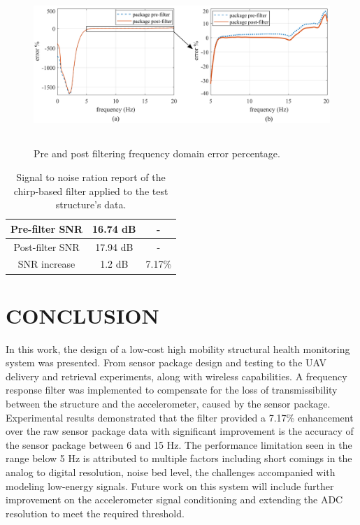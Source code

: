 \documentclass[]{spie}  %
\begin{document}
	\begin{figure} [H]
		\centering
		\includegraphics[height=6cm]{figures/Chirp Structure Error.png}
		\caption{Pre and post filtering frequency domain error percentage.}
		\label{fig:chirp structure error} 	
	\end{figure} 

	\begin{table}[H]
	\caption{Signal to noise ration report of the chirp-based filter applied to the test structure’s data.} 
	\label{tab:SNR Report}
	\begin{center}       
		\begin{tabular}{|c|c|c|} 
			\hline
			\rule[-1ex]{0pt}{3.5ex}  Pre-filter SNR & 16.74 dB & - \\
			\hline
			\rule[-1ex]{0pt}{3.5ex}  Post-filter SNR & 17.94 dB & - \\
			\hline
			\rule[-1ex]{0pt}{3.5ex}  SNR increase & 1.2 dB & 7.17\% \\
			\hline
		\end{tabular}
	\end{center}
	\end{table}
	
	\section{CONCLUSION}
	In this work, the design of a low-cost high mobility structural health monitoring system was presented. From sensor package design and testing to the UAV delivery and retrieval experiments, along with wireless capabilities. A frequency response filter was implemented to compensate for the loss of transmissibility between the structure and the accelerometer, caused by the sensor package. Experimental results demonstrated that the filter provided a 7.17\% enhancement over the raw sensor package data with significant improvement is the accuracy of the sensor package between 6 and 15 Hz. The performance limitation seen in the range below 5 Hz is attributed to multiple factors including short comings in the analog to digital resolution, noise bed level, the challenges accompanied with modeling low-energy signals. Future work on this system will include further improvement on the accelerometer signal conditioning and extending the ADC resolution to meet the required threshold.  
	
\end{document}
